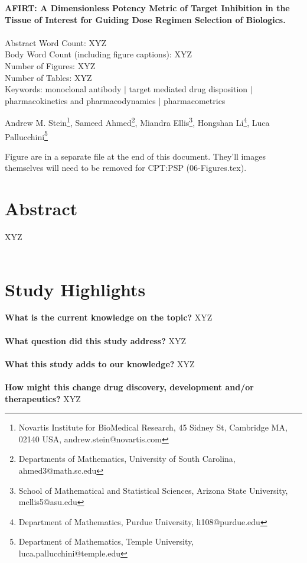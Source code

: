\documentclass{article}
\date{}
\begin{document}
{\Large{\bf AFIRT: A Dimensionless Potency Metric of Target Inhibition in the Tissue of Interest for Guiding Dose Regimen Selection of Biologics.}} 
~
\\
\\
Abstract Word Count: XYZ
\\
Body Word Count (including figure captions): XYZ
\\
Number of Figures: XYZ 
\\
Number of Tables: XYZ
\\
Keywords: monoclonal antibody $|$ target mediated drug disposition $|$ pharmacokinetics and pharmacodynamics $|$ pharmacometrics

\bigskip

\def\thefootnote{\arabic{footnote}}
\begin{center}
    Andrew M. Stein\footnote{Novartis Institute for BioMedical Research, 45 Sidney St, Cambridge MA, 02140 USA, andrew.stein@novartis.com},
    Sameed Ahmed\footnote{Departments of Mathematics, University of South Carolina, ahmed3@math.sc.edu},
    Miandra Ellis\footnote{School of Mathematical and Statistical Sciences, Arizona State University, mellis5@asu.edu},
    Hongshan Li\footnote{Department of Mathematics, Purdue University, li108@purdue.edu},
    Luca Pallucchini\footnote{Department of Mathematics, Temple University,  luca.pallucchini@temple.edu}
\end{center}

\tableofcontents

Figure are in a separate file at the end of this document.  They'll images themselves will need to be removed for CPT:PSP (06-Figures.tex). 

\section*{Abstract}
XYZ
\\
\\

\newpage







\section*{Study Highlights}
\textbf{What is the current knowledge on the topic?}
XYZ
\\ \\
\textbf{What question did this study address?}
XYZ
\\ \\
\textbf{What this study adds to our knowledge?}
XYZ
\\ \\
\textbf{How might this change drug discovery, development and/or therapeutics?}
XYZ
\end{document}

